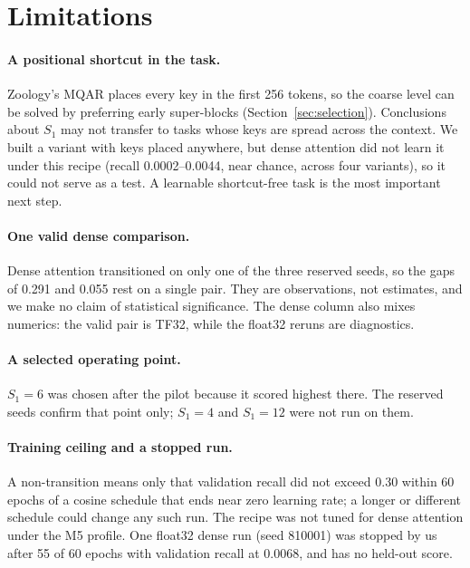 \section{Limitations}
\label{sec:limitations}

\paragraph{A positional shortcut in the task.} Zoology's MQAR places every key in the first 256 tokens, so the
coarse level can be solved by preferring early super-blocks (Section~\ref{sec:selection}). Conclusions about $S_1$ may not
transfer to tasks whose keys are spread across the context. We built a variant with keys placed anywhere, but dense
attention did not learn it under this recipe (recall 0.0002--0.0044, near chance, across four variants), so it could not serve
as a test. A learnable shortcut-free task is the most important next step.

\paragraph{One valid dense comparison.} Dense attention transitioned on only one of the three reserved seeds, so the
gaps of 0.291 and 0.055 rest on a single pair. They are observations, not estimates, and we make no claim of
statistical significance. The dense column also mixes numerics: the valid pair is TF32, while the float32 reruns are
diagnostics.

\paragraph{A selected operating point.} $S_1{=}6$ was chosen after the pilot because it scored highest there. The
reserved seeds confirm that point only; $S_1{=}4$ and $S_1{=}12$ were not run on them.

\paragraph{Training ceiling and a stopped run.} A non-transition means only that validation recall did not exceed
0.30 within 60 epochs of a cosine schedule that ends near zero learning rate; a longer or different schedule could
change any such run. The recipe was not tuned for dense attention under the M5 profile. One float32 dense
run (seed 810001) was stopped by us after 55 of 60 epochs with validation recall at 0.0068, and has no held-out score.

